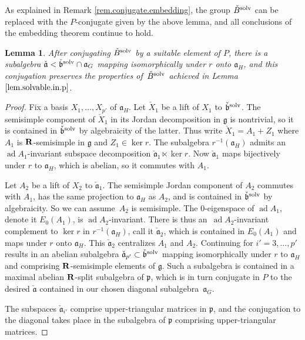 \documentclass[pdftex]{sigma}
\numberwithin{equation}{section}
\newtheorem{lem}[thm]{Lemma}
\theoremstyle{definition}
\newcommand{\BR}{{\bf R}}
\def\g{{\mathfrak g}}
\def\p{{\mathfrak p}}
\def\a{{\mathfrak a}}
\def\b{{\mathfrak b}}
\newcommand{\ad}{\operatorname{ad}}
\begin{document}
As explained in Remark \ref{rem.conjugate.embedding}, the group $\check{B}^{\rm solv}$ can be replaced with the $P$-conjugate given by the above lemma, and all conclusions of the embedding theorem continue to hold.

 \begin{lem}
After conjugating $\check{B}^{\rm solv}$ by a suitable element of $P$, there is a subalgebra $ \check{\a} < \check{\b}^{\rm solv} \cap \a_G$ mapping isomorphically under $r$ onto $\a_H$, and this conjugation preserves the properties of~$\check{B}^{\rm solv}$ achieved in Lemma~$\ref{lem.solvable.in.p}$.
 \end{lem}

 \begin{proof}
 Fix a basis $X_1, \dots, X_{p'}$ of $\a_H$. Let $\check{X}_1$ be a lift of $X_1$ to $\check{\b}^{\rm solv}$. The semisimple component of $\check{X}_1$ in its Jordan decomposition in $\g$ is nontrivial, so it is contained in $\check{\b}^{\rm solv}$ by algebraicity of the latter. Thus write $\check{X}_1 = A_1 + Z_1$ where $A_1$ is $\BR$-semisimple in $\g$ and $Z_1 \in \ker r$. The subalgebra $r^{-1}(\a_H)$ admits an $\ad A_1$-invariant subspace decomposition $\check{\a}_1 \ltimes \ker r$. Now $\check{\a}_1$ maps bijectively under $r$ to $\a_H$, which is abelian, so it commutes with $A_1$.

 Let $A_2$ be a lift of $X_2$ to $\check{\a}_1$. The semisimple Jordan component of $A_2$ commutes with $A_1$, has the same projection to $\a_H$ as $A_2$, and is contained in $\check{\b}^{\rm solv}$ by algebraicity. So we can assume~$A_2$ is semisimple. The $0$-eigenspace of $\ad A_1$, denote it $E_0(A_1)$, is $\ad A_2$-invariant. There is thus an~$\ad A_2$-invariant complement to $\ker r$ in $r^{-1}(\a_H)$, call it $\check{\a}_2$, which is contained in $E_0(A_1)$ and maps under $r$ onto $\a_H$. This $\check{\a}_2$ centralizes $A_1$ and $A_2$. Continuing for $i' = 3, \dots, p'$ results in an abelian subalgebra $\check{\a}_{p'} \subset \check{\b}^{\rm solv}$ mapping isomorphically under $r$ to $\a_H$ and comprising $\BR$-semisimple elements of $\g$. Such a subalgebra is contained in a maximal abelian $\BR$-split subalgebra of $\p$, which is in turn conjugate in $P$ to the desired $\check{\a}$ contained in our chosen diagonal subalgebra~$\a_G$.

The subspaces $\check{\a}_{i'}$ comprise upper-triangular matrices in $\p$, and the conjugation to the diagonal takes place in the subalgebra of $\p$ comprising upper-triangular matrices.
 \end{proof}
\end{document}

